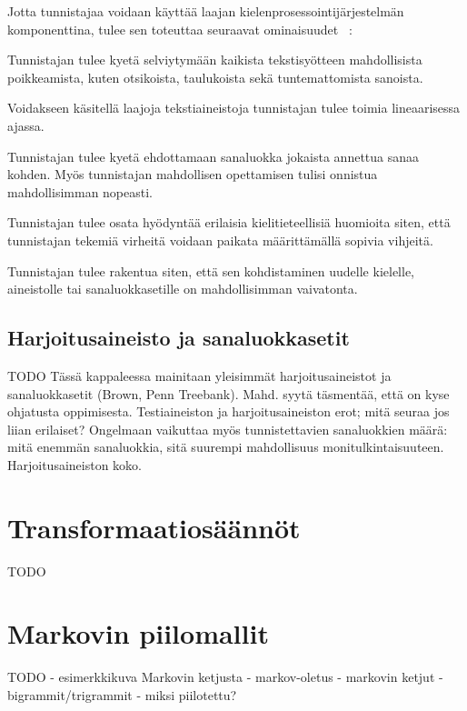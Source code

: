 \documentclass[utf8,bachelor,manualbib]{gradu3}
\begin{document}
Jotta tunnistajaa voidaan käyttää laajan kielenprosessointijärjestelmän komponenttina, tulee sen toteuttaa seuraavat ominaisuudet ~\citep{cutting1992}: 

\begin{description}[labelindent=1cm]
 \item[Kestävyys] Tunnistajan tulee kyetä selviytymään kaikista tekstisyötteen mahdollisista poikkeamista, kuten otsikoista, taulukoista sekä tuntemattomista sanoista.
 \item[Tehokkuus] Voidakseen käsitellä laajoja tekstiaineistoja tunnistajan tulee toimia lineaarisessa ajassa. 
 \item[Tarkkuus] Tunnistajan tulee kyetä ehdottamaan sanaluokka jokaista annettua sanaa kohden. Myös tunnistajan mahdollisen opettamisen tulisi onnistua mahdollisimman nopeasti.
 \item[Viritettävyys] Tunnistajan tulee osata hyödyntää erilaisia kielitieteellisiä huomioita siten, että tunnistajan tekemiä virheitä voidaan paikata määrittämällä sopivia vihjeitä.
 \item[Uudelleenkäytettävyys] Tunnistajan tulee rakentua siten, että sen kohdistaminen uudelle kielelle, aineistolle tai sanaluokkasetille on mahdollisimman vaivatonta.
\end{description}

\section{Harjoitusaineisto ja sanaluokkasetit}

TODO Tässä kappaleessa mainitaan yleisimmät harjoitusaineistot ja sanaluokkasetit (Brown, Penn Treebank). Mahd. syytä täsmentää, että on kyse ohjatusta oppimisesta. Testiaineiston ja harjoitusaineiston erot; mitä seuraa jos liian erilaiset? Ongelmaan vaikuttaa myös tunnistettavien sanaluokkien määrä: mitä enemmän sanaluokkia, sitä suurempi mahdollisuus monitulkintaisuuteen. Harjoitusaineiston koko.


\chapter{Transformaatiosäännöt}

TODO


\chapter{Markovin piilomallit}

TODO
- esimerkkikuva Markovin ketjusta
- markov-oletus
- markovin ketjut
- bigrammit/trigrammit
- miksi piilotettu?
\end{document}
